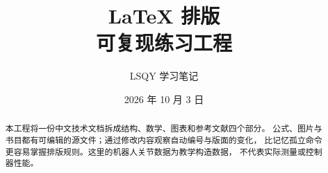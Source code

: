 \documentclass[UTF8,fontset=fandol,a4paper,11pt]{ctexart}
\title{\LaTeX{} 排版\\[0.4em]\large 可复现练习工程}
\author{LSQY 学习笔记}
\date{2026 年 10 月 3 日}
\begin{document}
\maketitle
\thispagestyle{fancy}
\begin{abstract}
本工程将一份中文技术文档拆成结构、数学、图表和参考文献四个部分。
公式、图片与书目都有可编辑的源文件；通过修改内容观察自动编号与版面的变化，
比记忆孤立命令更容易掌握排版规则。这里的机器人关节数据为教学构造数据，
不代表实际测量或控制器性能。
\end{abstract}
\tableofcontents

\clearpage

\clearpage

\clearpage

\clearpage

\end{document}
